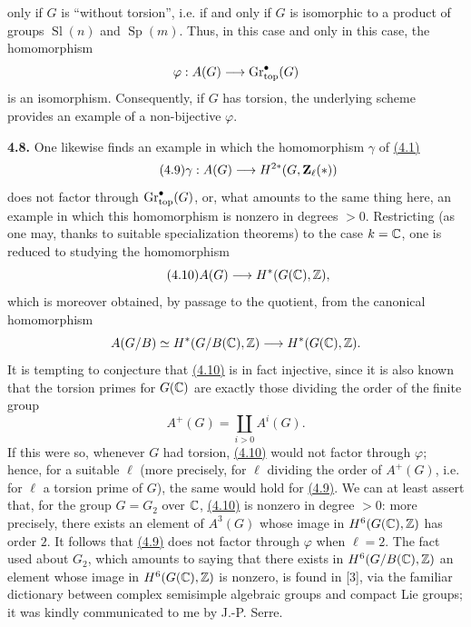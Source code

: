 only if $G$ is ``without torsion'', i.e. if and only if $G$ is isomorphic to
a product of groups $\operatorname{Sl}(n)$ and $\operatorname{Sp}(m)$. Thus,
in this case and only in this case, the homomorphism
\[
 \varphi:A(G)\longrightarrow\operatorname{Gr}_{\mathrm{top}}^\bullet(G)
\]
is an isomorphism. Consequently, if $G$ has torsion, the underlying scheme
provides an example of a non-bijective $\varphi$.

\noindent{}\textbf{4.8.}
One likewise finds an example in which the homomorphism $\gamma$ of \hyperlink{sga6.e14.eq.4-1}{(4.1)}
\begin{equation}\tag{4.9}
 \gamma:A(G)\longrightarrow H^{2*}(G,\mathbf Z_\ell(*))
\end{equation}
does not factor through $\operatorname{Gr}_{\mathrm{top}}^\bullet(G)$, or, what amounts to the same
thing here, an example in which this homomorphism is nonzero in degrees
$>0$. Restricting (as one may, thanks to suitable specialization theorems)
to the case $k=\mathbb C$, one is reduced to studying the homomorphism
\begin{equation}\tag{4.10}
 A(G)\longrightarrow H^*(G(\mathbb C),\mathbb Z),
\end{equation}
which is moreover obtained, by passage to the quotient, from the canonical
homomorphism
\[
 A(G/B)\simeq H^*(G/B(\mathbb C),\mathbb Z)
 \longrightarrow H^*(G(\mathbb C),\mathbb Z).
\]
It is tempting to conjecture that \hyperlink{sga6.e14.eq.4-10}{(4.10)} is in fact injective, since it is
also known that the torsion primes for $G(\mathbb C)$ are exactly those dividing
the order of the finite group
\[
 A^+(G)=\coprod_{i>0}A^i(G).
\]
If this were so, whenever $G$ had torsion, \hyperlink{sga6.e14.eq.4-10}{(4.10)} would not factor through
$\varphi$; hence, for a suitable $\ell$ (more precisely, for $\ell$ dividing
the order of $A^+(G)$, i.e. for $\ell$ a torsion prime of $G$), the same
would hold for \hyperlink{sga6.e14.eq.4-9}{(4.9)}. We can at least assert that, for the group $G=G_2$
over $\mathbb C$, \hyperlink{sga6.e14.eq.4-10}{(4.10)} is nonzero in degree $>0$: more precisely, there exists an
element of $A^3(G)$ whose image in $H^6(G(\mathbb C),\mathbb Z)$ has order $2$. It follows
that \hyperlink{sga6.e14.eq.4-9}{(4.9)} does not factor through $\varphi$ when $\ell=2$. The fact used
about $G_2$, which amounts to saying that there exists in
$H^6(G/B(\mathbb C),\mathbb Z)$ an element whose image in $H^6(G(\mathbb C),\mathbb Z)$ is nonzero, is
found in [3], via the familiar dictionary between complex semisimple
algebraic groups and compact Lie groups; it was kindly communicated to me
by J.-P. Serre.


